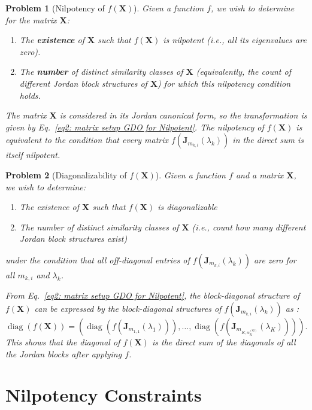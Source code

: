 \documentclass[11pt]{article}
\newtheorem{problem}{Problem}[section] %
\begin{document}
\begin{problem}[Nilpotency of $f(\bm{X})$]\label{prob:nilpotency}
Given a function $f$, we wish to determine for the matrix $\bm{X}$:
\begin{enumerate}
    \item The \textbf{existence} of $\bm{X}$ such that $f(\bm{X})$ is nilpotent (i.e., all its eigenvalues are zero).
    \item The \textbf{number} of distinct similarity classes of $\bm{X}$ (equivalently, the count of different Jordan block structures of $\bm{X}$) for which this nilpotency condition holds.
\end{enumerate}

The matrix $\bm{X}$ is considered in its Jordan canonical form, so the transformation is given by Eq.~\eqref{eq2: matrix setup GDO for Nilpotent}. The nilpotency of $f(\bm{X})$ is equivalent to the condition that every matrix $f(\bm{J}_{m_{k,i}}(\lambda_{k}))$ in the direct sum is itself nilpotent.
\end{problem}


\begin{problem}[Diagonalizability of $f(\bm{X})$]\label{prob:diagonalizability}
Given a function $f$ and a matrix $\bm{X}$, we wish to determine:
\begin{enumerate}
    \item The existence of $\bm{X}$ such that $f(\bm{X})$ is diagonalizable
    \item The number of distinct similarity classes of $\bm{X}$ (i.e., count how many different Jordan block structures exist)
\end{enumerate}
under the condition that all off-diagonal entries of $f(\bm{J}_{m_{k,i}}(\lambda_{k}))$ are zero for all $m_{k,i}$ and $\lambda_k$.

From Eq.~\eqref{eq2: matrix setup GDO for Nilpotent}, the block-diagonal structure of $f(\bm{X})$ can be expressed by the block-diagonal structures of  $f(\bm{J}_{m_{k,i}}(\lambda_{k}))$ as :
\[
\operatorname{diag}(f(\bm{X})) = \left(\operatorname{diag}(f(\bm{J}_{m_{1,1}}(\lambda_{1}))), \ldots, \operatorname{diag}(f(\bm{J}_{m_{K,\alpha_{K}^{(\mathrm{G})}}}(\lambda_{K})))\right).
\]
This shows that the diagonal of $f(\bm{X})$ is the direct sum of the diagonals of all the Jordan blocks after applying $f$.
%
\end{problem}

\section{Nilpotency Constraints}\label{sec:Nilpotency Constraints}
\end{document}
